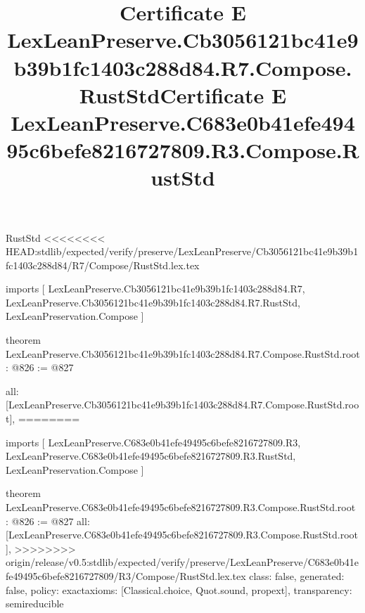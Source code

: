 \begin{lexlean}{RustStd}
<<<<<<<< HEAD:stdlib/expected/verify/preserve/LexLeanPreserve/Cb3056121bc41e9b39b1fc1403c288d84/R7/Compose/RustStd.lex.tex
\title{Certificate E LexLeanPreserve.Cb3056121bc41e9b39b1fc1403c288d84.R7.Compose.RustStd}
\begin{coremodule}
imports [
  LexLeanPreserve.Cb3056121bc41e9b39b1fc1403c288d84.R7,
  LexLeanPreserve.Cb3056121bc41e9b39b1fc1403c288d84.R7.RustStd,
  LexLeanPreservation.Compose
]

theorem LexLeanPreserve.Cb3056121bc41e9b39b1fc1403c288d84.R7.Compose.RustStd.root : @826 := @827 {
  all: [LexLeanPreserve.Cb3056121bc41e9b39b1fc1403c288d84.R7.Compose.RustStd.root],
========
\title{Certificate E LexLeanPreserve.C683e0b41efe49495c6befe8216727809.R3.Compose.RustStd}
\begin{coremodule}
imports [
  LexLeanPreserve.C683e0b41efe49495c6befe8216727809.R3,
  LexLeanPreserve.C683e0b41efe49495c6befe8216727809.R3.RustStd,
  LexLeanPreservation.Compose
]

theorem LexLeanPreserve.C683e0b41efe49495c6befe8216727809.R3.Compose.RustStd.root : @826 := @827 {
  all: [LexLeanPreserve.C683e0b41efe49495c6befe8216727809.R3.Compose.RustStd.root],
>>>>>>>> origin/release/v0.5:stdlib/expected/verify/preserve/LexLeanPreserve/C683e0b41efe49495c6befe8216727809/R3/Compose/RustStd.lex.tex
  class: false,
  generated: false,
  policy: exact{axioms: [Classical.choice, Quot.sound, propext]},
  transparency: semireducible
}


\end{coremodule}}
\end{coremodule}
\end{lexlean}
